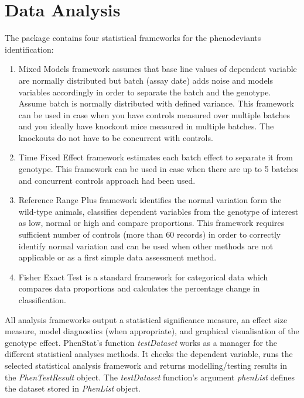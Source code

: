 \documentclass[a4paper]{article}
\begin{document}
\section{Data Analysis}
The package contains four statistical frameworks for the phenodeviants identification:
\begin{enumerate}
\item Mixed Models framework assumes that base line values of dependent variable are normally distributed but batch (assay date) adds noise and models variables accordingly in order to separate the batch and the genotype. Assume batch is normally distributed with defined variance. This framework can be used in case when you have controls measured over multiple batches and you ideally have knockout mice measured in multiple batches. The knockouts do not have to be concurrent with controls.
\item Time Fixed Effect framework estimates each batch effect to separate it from genotype. This framework can be used in case when there are up to 5 batches and concurrent controls approach had been used. 
\item Reference Range Plus framework identifies the normal variation form the wild-type animals, classifies dependent variables from the genotype of interest as low, normal or high and compare proportions. This framework requires sufficient number of controls (more than 60 records) in order to correctly identify normal variation and can be used when other methods are not applicable or as a first simple data assessment method.  
\item Fisher Exact Test is a standard framework for categorical data which compares data proportions and calculates the percentage change in classification.
\end{enumerate}
All analysis frameworks output a statistical significance measure, an effect size measure, model diagnostics (when appropriate), and graphical visualisation of the genotype effect.
\newline\newline
PhenStat's function \textit{testDataset} works as a manager for the different statistical analyses methods. It checks the dependent variable, runs the selected statistical analysis framework and  returns modelling\slash testing results in the \textit{PhenTestResult} object.
\newline\newline
The \textit{testDataset} function's argument \textit{phenList} defines the dataset stored in \textit{PhenList} object.
\end{document}
